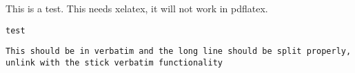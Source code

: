 \documentclass{article}
\begin{document}
This is a test. This needs xelatex, it will not work in pdflatex.

\verb!test!

\verb!This should be in verbatim and the long line should be split properly, unlink with the stick verbatim functionality!
\end{document}
